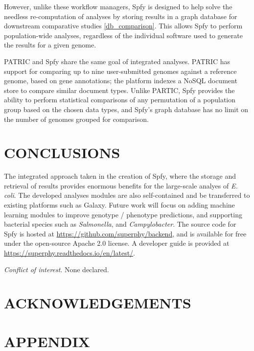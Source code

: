 \documentclass{article}
\begin{document}
However, unlike these workflow managers, Spfy is designed to help solve the needless re-computation of analyses by storing results in a graph database for downstream comparative studies \ref{db_comparison}. This allows Spfy to perform population-wide analyses, regardless of the individual software used to generate the results for a given genome.

\small 

PATRIC \cite{wattam2016improvements} and Spfy share the same goal of integrated analyses. PATRIC has support for comparing up to nine user-submitted genomes against a reference genome, based on gene annotations; the platform indexes a NoSQL document store to compare similar document types. Unlike PARTIC, Spfy provides the ability to perform statistical comparisons of any permutation of a population group based on the chosen data types, and Spfy's graph database has no limit on the number of genomes grouped for comparison.

\section{CONCLUSIONS}

The integrated approach taken in the creation of Spfy, where the storage and retrieval of results provides enormous benefits for the large-scale analyes of \textit{E. coli}. The developed analyses modules are also self-contained and be transferred to existing platforms such as Galaxy. Future work will focus on adding machine learning modules to improve genotype / phenotype predictions, and supporting bacterial species such as \textit{Salmonella}, and \textit{Campylobacter}. The source code for Spfy is hosted at \url{https://github.com/superphy/backend}, and is available for free under the open-source Apache 2.0 license. A developer guide is provided at \url{https://superphy.readthedocs.io/en/latest/}.

\textit{Conflict of interest}. None declared.

\section{ACKNOWLEDGEMENTS}

\newpage




\newpage

\section{APPENDIX}
\end{document}
